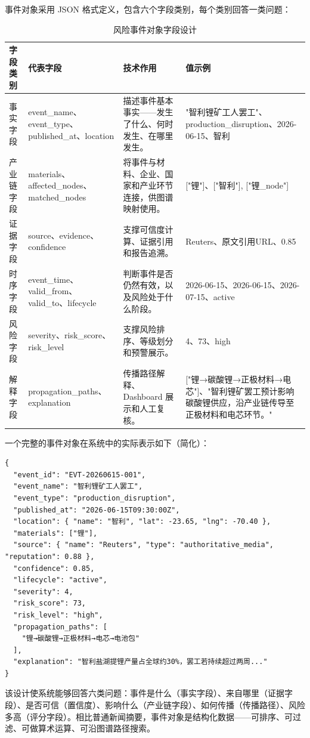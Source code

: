 \documentclass[12pt,a4paper]{ctexart}
\begin{document}
事件对象采用 JSON 格式定义，包含六个字段类别，每个类别回答一类问题：

\begin{table}[htbp]
\centering
\caption{风险事件对象字段设计}
\begin{tabularx}{\textwidth}{p{2.0cm}p{2.8cm}p{3.8cm}X}
\toprule
字段类别 & 代表字段 & 技术作用 & 值示例 \\
\midrule
事实字段 & event\_name、event\_type、published\_at、location & 描述事件基本事实——发生了什么、何时发生、在哪里发生。 & "智利锂矿工人罢工"、production\_disruption、2026-06-15、智利 \\
产业链字段 & materials、affected\_nodes、matched\_nodes & 将事件与材料、企业、国家和产业环节连接，供图谱映射使用。 & ["锂"]、["智利"], ["锂\_node"] \\
证据字段 & source、evidence、confidence & 支撑可信度计算、证据引用和报告追溯。 & Reuters、原文引用URL、0.85 \\
时序字段 & event\_time、valid\_from、valid\_to、lifecycle & 判断事件是否仍然有效，以及风险处于什么阶段。 & 2026-06-15、2026-06-15、2026-07-15、active \\
风险字段 & severity、risk\_score、risk\_level & 支撑风险排序、等级划分和预警展示。 & 4、73、high \\
解释字段 & propagation\_paths、explanation & 传播路径解释、Dashboard 展示和人工复核。 & ["锂→碳酸锂→正极材料→电芯"]、"智利锂矿罢工预计影响碳酸锂供应，沿产业链传导至正极材料和电芯环节。" \\
\bottomrule
\end{tabularx}
\end{table}

一个完整的事件对象在系统中的实际表示如下（简化）：

\begin{verbatim}
{
  "event_id": "EVT-20260615-001",
  "event_name": "智利锂矿工人罢工",
  "event_type": "production_disruption",
  "published_at": "2026-06-15T09:30:00Z",
  "location": { "name": "智利", "lat": -23.65, "lng": -70.40 },
  "materials": ["锂"],
  "source": { "name": "Reuters", "type": "authoritative_media", "reputation": 0.88 },
  "confidence": 0.85,
  "lifecycle": "active",
  "severity": 4,
  "risk_score": 73,
  "risk_level": "high",
  "propagation_paths": [
    "锂→碳酸锂→正极材料→电芯→电池包"
  ],
  "explanation": "智利盐湖提锂产量占全球约30%，罢工若持续超过两周..."
}
\end{verbatim}

该设计使系统能够回答六类问题：事件是什么（事实字段）、来自哪里（证据字段）、是否可信（置信度）、影响什么（产业链字段）、如何传播（传播路径）、风险多高（评分字段）。相比普通新闻摘要，事件对象是结构化数据——可排序、可过滤、可做算术运算、可沿图谱路径搜索。
\end{document}
